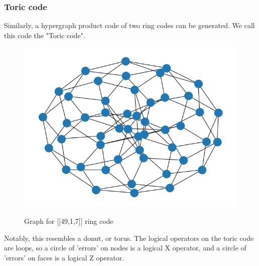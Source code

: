 \subsubsection{Toric code}
Similarly, a hypergraph product code of two ring codes can be 
generated. We call this code the "Toric code".\\
\begin{figure}[h!]
	\begin{center}
	\captionsetup{justification=centering,margin=2cm}
	\includegraphics[scale=0.4]{./img/figures/toric_5_graph.png}\\
	\caption{Graph for [[49,1,7]] ring code}
        
	\label{fig: toric_graph}
	\end{center}
\end{figure}
Notably, this resembles a donut, or torus.
The logical operators on the toric code are loops, so a circle of 
'errors' on nodes is a logical X operator, and a circle of 'errors'
on faces is a logical Z operator.
